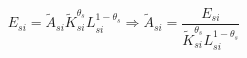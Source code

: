 \begin{gather*}
    E_{si} = \tilde{A}_{si}\tilde{K}_{si}^{\theta_s} L_{si}^{1-\theta_s} \Rightarrow \tilde{A}_{si} = \dfrac{E_{si}}{\tilde{K}_{si}^{\theta_s} L_{si}^{1-\theta_s}}\\
\end{gather*}
